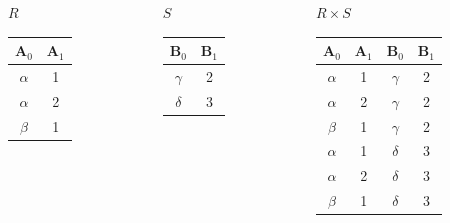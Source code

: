 \documentclass[11pt, handout]{beamer}
\begin{document}
  \begin{frame}
    \begin{columns}[T]
      \begin{column}{0.25\textwidth}
        \centering $R$
        \medskip \\
        \begin{tabular}{|c|c|}
          \hline
          $\textbf{A}_0$ & $\textbf{A}_1$ \\[0.5ex] \hline\hline
          $\alpha$ & 1 \\ \hline
          $\alpha$ & 2 \\ \hline
          $\beta$ & 1 \\ \hline
        \end{tabular}
      \end{column}
      \begin{column}{0.25\textwidth}
        \centering $S$
        \medskip \\
        \begin{tabular}{|c|c|}
          \hline
          $\textbf{B}_0$ & $\textbf{B}_1$ \\[0.5ex] \hline\hline
          $\gamma$ & 2 \\ \hline
          $\delta$ & 3 \\ \hline
        \end{tabular}
      \end{column}
      \begin{column}{0.4\textwidth}
        \centering $R \times S$
        \medskip \\
        \begin{tabular}{|c|c|c|c|}
          \hline
          $\textbf{A}_0$ & $\textbf{A}_1$ & $\textbf{B}_0$ & $\textbf{B}_1$\\[0.5ex] \hline\hline
          $\alpha$ & 1 & $\gamma$ & 2 \\ \hline
          $\alpha$ & 2 & $\gamma$ & 2 \\ \hline
          $\beta$ & 1 & $\gamma$ & 2 \\ \hline
          $\alpha$ & 1 & $\delta$ & 3 \\ \hline
          $\alpha$ & 2 & $\delta$ & 3\\ \hline
          $\beta$ & 1 & $\delta$ & 3\\ \hline
        \end{tabular}
      \end{column}
    \end{columns}
  \end{frame}
\end{document}

